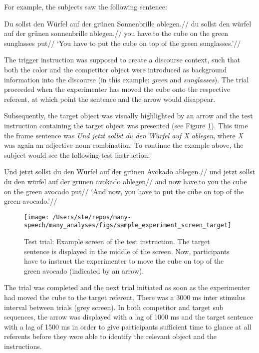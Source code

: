 \documentclass[
  12pt,
]{article}
\begin{document}
For example, the subjects saw the following sentence:

\ex \begingl
\glpreamble Du sollst den Würfel auf der grünen Sonnenbrille ablegen.//
\gla du sollst den würfel auf der grünen sonnenbrille ablegen.//
\glb you have.to the cube on the green sunglasses put//
\glft `You have to put the cube on top of the green sunglasses.'//
\endgl \xe

The trigger instruction was supposed to create a discourse context, such that both the color and the competitor object were introduced as background information into the discourse (in this example: \emph{green} and \emph{sunglasses}).
The trial proceeded when the experimenter has moved the cube onto the respective referent, at which point the sentence and the arrow would disappear.

Subsequently, the target object was visually highlighted by an arrow and the test instruction containing the target object was presented (see Figure \ref{fig:image2}).
This time the frame sentence was \emph{Und jetzt sollst du den Würfel auf X ablegen}, where \emph{X} was again an adjective-noun combination.
To continue the example above, the subject would see the following test instruction:

\ex \begingl
\glpreamble Und jetzt sollst du den Würfel auf der grünen Avokado ablegen.//
\gla und jetzt sollst du den würfel auf der grünen avokado ablegen//
\glb and now have.to you the cube on the green avocado put//
\glft `And now, you have to put the cube on top of the green avocado.'//
\endgl \xe

\begin{figure}[tbp]

{\centering \texttt{[image: /Users/ste/repos/many-speech/many\_analyses/figs/sample\_experiment\_screen\_target]} 

}

\caption{Test trial: Example screen of the test instruction. The target sentence is displayed in the middle of the screen. Now, participants have to instruct the experimenter to move the cube on top of the green avocado (indicated by an arrow).}\label{fig:image2}
\end{figure}

The trial was completed and the next trial initiated as soon as the experimenter had moved the cube to the target referent.
There was a 3000 ms inter stimulus interval between trials (grey screen).
In both competitor and target sub sequences, the arrow was displayed with a lag of 1000 ms and the target sentence with a lag of 1500 ms in order to give participants sufficient time to glance at all referents before they were able to identify the relevant object and the instructions.
\end{document}

